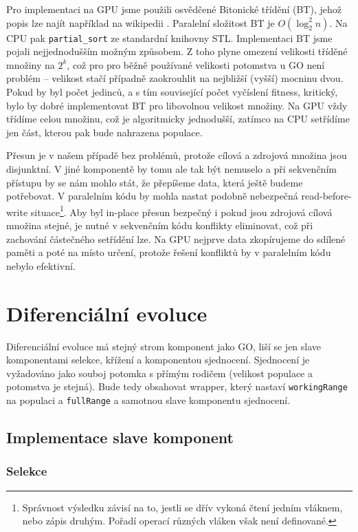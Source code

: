 Pro implementaci na GPU jsme použili osvědčené Bitonické třídění (BT), jehož popis lze najít například na wikipedii . Paralelní složitost BT je $O(\log_2^2 n)$. Na CPU pak \texttt{partial\_sort} ze standardní knihovny STL. Implementaci BT jsme pojali nejjednodušším možným způsobem. Z toho plyne omezení velikosti tříděné množiny na $2^k$, což pro pro běžně používané velikosti potomstva u GO není problém -- velikost stačí případně zaokrouhlit na nejbližší (vyšší) mocninu dvou. Pokud by byl počet jedinců, a s tím související počet vyčíslení fitness, kritický, bylo by dobré implementovat BT pro libovolnou velikost množiny. Na GPU vždy třídíme celou množinu, což je algoritmicky jednodušší, zatímco na CPU setřídíme jen část, kterou pak bude nahrazena populace.\vspace{0.2cm}

Přesun je v našem případě bez problémů, protože cílová a zdrojová množina jsou disjunktní. V jiné komponentě by tomu ale tak být nemuselo a při sekvenčním přístupu by se nám mohlo stát, že přepíšeme data, která ještě budeme potřebovat. V paralelním kódu by mohla nastat podobně nebezpečná read-before-write situace\footnote{Správnost výsledku závisí na to, jestli se dřív vykoná čtení jedním vláknem, nebo zápis druhým. Pořadí operací různých vláken však není definované.}. Aby byl in-place přesun bezpečný i pokud jsou zdrojová cílová množina stejné, je nutné v sekvenčním kódu konflikty eliminovat, což při zachování částečného setřídění lze. Na GPU nejprve data zkopírujeme do sdílené paměti a poté na místo určení, protože řešení konfliktů by v paralelním kódu nebylo efektivní.

\section{Diferenciální evoluce}

Diferenciální evoluce má stejný strom komponent jako GO, liší se jen slave komponentami selekce, křížení a komponentou sjednocení. Sjednocení je vyžadováno jako souboj potomka s přímým rodičem (velikost populace a potomstva je stejná). Bude tedy obsahovat wrapper, který nastaví \texttt{workingRange} na populaci a \texttt{fullRange} a samotnou slave komponentu sjednocení.

\subsection{Implementace slave komponent}

\subsubsection{Selekce}

